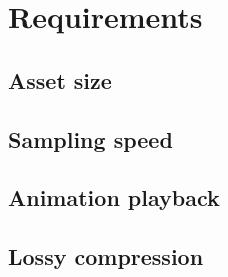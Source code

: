 \section{Requirements} \label{requirements}
\subsection{Asset size} \label{requirements:asset_size}
\subsection{Sampling speed} \label{requirements:sampling_speed}
\subsection{Animation playback} \label{requirements:animation_playback}
\subsection{Lossy compression} \label{requirements:lossy_compression}
